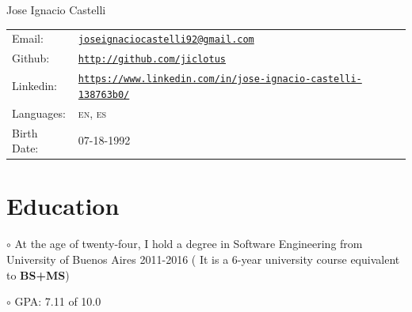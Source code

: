 \documentclass[letterpaper]{article}
\def\name{Jose Ignacio Castelli}
\newenvironment{no-indent-itemize}{
  \begin{list}{}{
    \setlength{\leftmargin}{0em}
  }
}{
  \end{list}
}
\def\bullet{$\circ$\xspace}
\begin{document}
{\huge \name}



\bigskip
\begin{minipage}{0.45\linewidth}
  \begin{tabular}{llll}
    
    
    Email: & \href{mailto:joseignaciocastelli92@gmail.com}{\tt joseignaciocastelli92@gmail.com} \\
     
    
    Github: &\href{http://github.com/jiclotus}{\tt http://github.com/jiclotus}\\
    
    Linkedin: &\href{https://www.linkedin.com/in/jose-ignacio-castelli-138763b0/}{\tt https://www.linkedin.com/in/jose-ignacio-castelli-138763b0/}\\
    
    Languages: & \textsc{en}, \textsc{es}\\
    Birth Date: & \textsc{07-18-1992}
    
    
  \end{tabular}
\end{minipage}


\hfill 
{}


\section*{Education}
\begin{no-indent-itemize}
  \item\bullet At the age of twenty-four, I hold a degree in Software Engineering from University of Buenos Aires 2011-2016 ( It is a 6-year university course equivalent to \textbf{BS+MS}) 
  \item\bullet GPA: 7.11 of 10.0
\end{no-indent-itemize}
\end{document}
